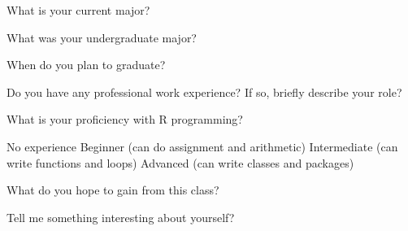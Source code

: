 \documentclass[12pt,addpoints,answers]{exam}%
\begin{document}
\runningfooter{}{}{}
\begin{center}
\vspace{1.5in}
\end{center}






\begin{questions}

\question What is your current major?


\question What was your undergraduate major?


\question When do you plan to graduate?


\question Do you have any professional work experience?  If so, briefly describe your role?


\question What is your proficiency with R programming?
\begin{checkboxes}
\choice No experience
\choice Beginner (can do assignment and arithmetic)
\choice Intermediate (can write functions and loops)
\choice Advanced (can write classes and packages)
\end{checkboxes}


\question What do you hope to gain from this class?


\question Tell me something interesting about yourself?



















\end{questions}
\end{document}

